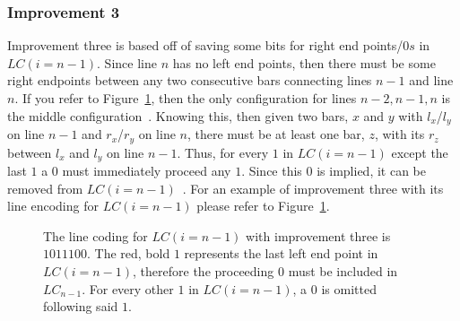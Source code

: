 \subsubsection{Improvement 3}
Improvement three is based off of saving some bits for right 
end points/$0s$ in $LC(i=n-1)$. Since line $n$ has no left end points,
then there must be some right endpoints between any two 
consecutive bars connecting lines $n-1$ and line $n$. If you 
refer to Figure~\ref{fig:improvement3}, then the only configuration for lines $n-2, n-1, n$
is the middle configuration~\cite{A5}. Knowing this, then 
given two bars, $x$ and $y$ with $l_{x}$/$l_{y}$ on line 
$n-1$ and $r_{x}$/$r_{y}$ on line $n$, there must be at least 
one bar, $z$, with its $r_{z}$ between $l_{x}$ and $l_{y}$
on line $n-1$. Thus, for every $1$ in $LC(i=n-1)$ except the 
last $1$ a $0$ must immediately proceed any $1$. 
Since this $0$ is implied, it can be removed from $LC(i=n-1)$~\cite{A5}. 
For an example of improvement three with its line encoding for $LC(i=n-1)$ please refer to Figure~\ref{fig:improvement3}.
\begin{figure}[h]
    \centering
    \caption{The line coding for $LC(i=n-1)$ with improvement three is $101110$\underline{$0$}. The red, bold $1$ represents 
    the last left end point in $LC(i=n-1)$, therefore the proceeding $0$ must be 
    included in $LC_{n-1}$. For every other $1$ in $LC(i=n-1)$, a $0$ is omitted following 
    said $1$.}
    \label{fig:improvement3}
\end{figure}
